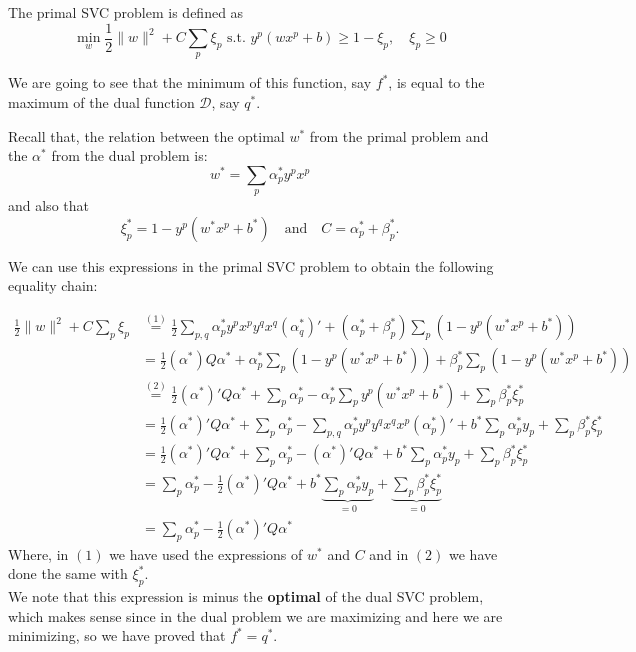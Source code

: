 \documentclass[11pt,table]{article}
\newcommand\norm[1]{\lVert#1\rVert}
\begin{document}
The primal SVC problem is defined as
\[
	\min_w \frac{1}{2}\norm{w}^2 + C \sum_p \xi_p \text{ s.t. } y^p(wx^p + b) \geq 1 - \xi_p,\quad \xi_p \geq 0
\]

We are going to see that the minimum of this function, say \(f^*\), is equal to the maximum of the dual function \(\mathcal D\), say \(q^*\).


Recall that, the relation between the optimal \(w^*\) from the primal problem and the \(\alpha^*\) from the dual problem is:
\[
	w^* = \sum_p \alpha^*_p y^p x^p
\]
and also that
\[
	\xi_p^* = 1-y^p(w^*x^p + b^*) \quad \text{and} \quad C = \alpha^*_p + \beta^*_p.
\]

We can use this expressions in the primal SVC problem to obtain the following equality chain:

\begin{align*}
	\frac{1}{2}\norm{w}^2 + C \sum_p \xi_p & \stackrel{(1)}{=} \frac{1}{2} \sum_{p,q} \alpha^*_p y^p x^p y^q x^q (\alpha^*_q)'  + (\alpha^*_p + \beta^*_p)\sum_p(1 - y^p(w^*x^p + b^*))                           \\
	                                       & = \frac{1}{2}(\alpha^*) Q \alpha^*+ \alpha^*_p \sum_p(1 - y^p(w^*x^p + b^*)) + \beta^*_p \sum_p(1 - y^p(w^*x^p + b^*))                                               \\
	                                       & \stackrel{(2)}{=} \frac{1}{2}(\alpha^*) ' Q \alpha^* + \sum_p \alpha^*_p -  \alpha^*_p\sum_p  y^p (w^*x^p + b^*) + \sum_p \beta^*_p \xi^*_p                          \\
	                                       & = \frac{1}{2}(\alpha^*)' Q \alpha^* + \sum_p \alpha^*_p - \sum_{p,q} \alpha_p^* y^p y^q x^q x^p (\alpha_p^*) ' + b^*\sum_p \alpha_p^* y_p + \sum_p \beta^*_p \xi^*_p \\
	                                       & = \frac{1}{2}(\alpha^*)' Q \alpha^* + \sum_p \alpha^*_p - (\alpha^*)' Q \alpha^*+ b^*\sum_p \alpha_p^* y_p + \sum_p \beta^*_p \xi^*_p                                \\
	                                       & = \sum_p \alpha^*_p - \frac{1}{2}(\alpha^*)' Q \alpha^*+ b^*\underbrace{\sum_p \alpha_p^* y_p}_{= 0} + \underbrace{\sum_p \beta^*_p \xi^*_p}_{= 0}                   \\
	                                       & = \sum_p \alpha^*_p - \frac{1}{2}(\alpha^*)' Q \alpha^*
\end{align*}
Where, in  \((1)\) we have used the expressions of \(w^*\) and \(C\) and in \((2)\) we have done the same with \(\xi_p^*\).\\
We note that this expression is minus the \textbf{optimal} of the dual SVC problem, which makes sense since in the dual problem we are maximizing and here we are minimizing, so we have proved that \(f^* = q^*\).\\
\end{document}
